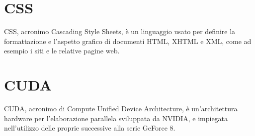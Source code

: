 \section{CSS}\label{sec:Cascading Style Sheets}
CSS, acronimo Cascading Style Sheets, è un linguaggio usato per definire la formattazione e l'aspetto grafico di documenti HTML, XHTML e XML, come ad esempio i siti e le relative pagine web.

\section{CUDA}\label{sec:Cascading Style Sheets}
CUDA, acronimo di Compute Unified Device Architecture, è un'architettura hardware per l'elaborazione parallela sviluppata da NVIDIA, e impiegata nell'utilizzo delle proprie  successive alla serie GeForce 8.